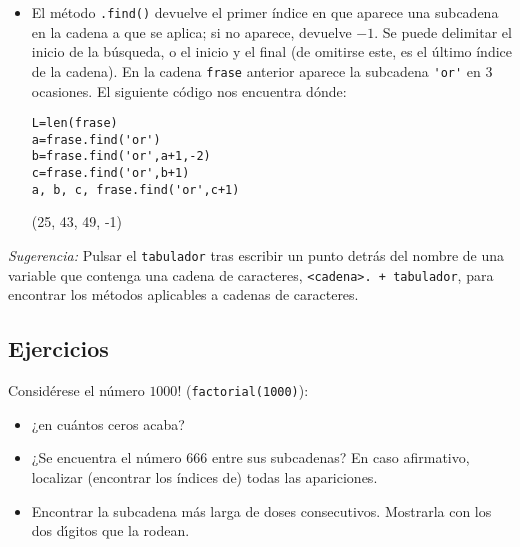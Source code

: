 \begin{itemize}
\item El método \lstinline|.find()| devuelve el primer índice en que aparece
una subcadena en la cadena a que se aplica; si no aparece, devuelve $-1$. Se
puede
delimitar el inicio de la búsqueda, o el inicio y el final (de omitirse este, es
el
último índice de la cadena). En la cadena \verb|frase| anterior aparece la
subcadena
\lstinline|'or'| en $3$ ocasiones. El siguiente código nos encuentra dónde:
\begin{lstlisting}
L=len(frase)
a=frase.find('or')
b=frase.find('or',a+1,-2)
c=frase.find('or',b+1)
a, b, c, frase.find('or',c+1)
\end{lstlisting}
\begin{Output}
	(25, 43, 49, -1)
\end{Output}

\end{itemize}

\noindent\emph{Sugerencia:} Pulsar el \verb|tabulador| tras escribir un punto
detr\'as
del nombre de una variable que contenga una cadena de caracteres, %
\verb|<cadena>. + tabulador|, para encontrar los métodos aplicables
a cadenas de caracteres.


\subsection{Ejercicios}
\label{ejer-1}
\begin{ejer} Considérese el número $1000!$ (\lstinline|factorial(1000)|):
\begin{itemize}
 \item ¿en cuántos ceros acaba?
 \item ¿Se encuentra el número $666$ entre sus subcadenas? 
 En caso afirmativo, localizar (encontrar los índices de) todas las apariciones.
 \item Encontrar la subcadena más larga de doses consecutivos. Mostrarla con los
dos
d\'{\i}gitos que la rodean.
\end{itemize}
\end{ejer}

